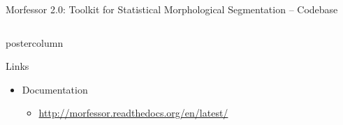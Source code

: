 \documentclass[final]{beamer} %
\begin{document}
\begin{frame}{Morfessor 2.0: Toolkit for Statistical Morphological Segmentation -- Codebase}
\begin{columns}
\begin{column}{.3\textwidth}
\begin{beamercolorbox}[center,wd=\textwidth]{postercolumn}
\begin{block}{Links}
\begin{itemize}
	              \item Documentation 
	                \begin{itemize}
	                \item \url{http://morfessor.readthedocs.org/en/latest/} 
	                \end{itemize}
%	
%			
%	
	              \end{itemize}              
	            \end{block}
	            
		\end{beamercolorbox}


\end{column}

\end{columns}
 \end{frame}



  
\end{document}
